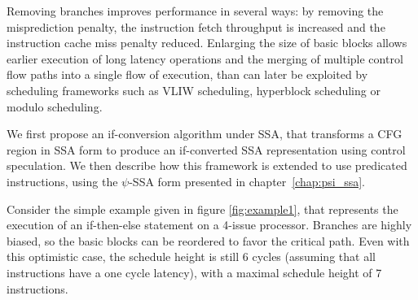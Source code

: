 Removing branches improves performance in several ways: by removing the misprediction penalty, the instruction fetch throughput is increased and the instruction cache miss penalty reduced. Enlarging the size of basic blocks allows earlier execution of long latency operations and the merging of multiple control flow paths into a single flow of execution, than can later be exploited by scheduling frameworks such as VLIW scheduling, hyperblock scheduling or modulo scheduling.

We first propose an if-conversion algorithm under SSA, that transforms a CFG region in SSA form to produce an if-converted SSA representation using control speculation.
We then describe how this framework is extended to use predicated instructions, using the $\psi$-SSA form presented in chapter~\ref{chap:psi_ssa}.

Consider the simple example given in figure \ref{fig:example1}, that represents the execution of an if-then-else statement on a 4-issue processor. Branches are highly biased, so the basic blocks can be reordered to favor the critical path. Even with this optimistic case, the schedule height is still 6 cycles (assuming that all instructions have a one cycle latency), with a maximal schedule height of 7 instructions. 

